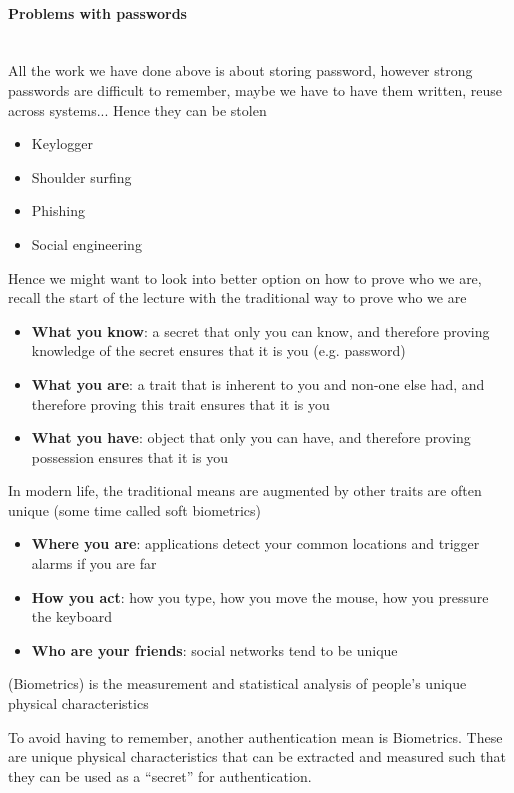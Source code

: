 \paragraph{Problems with passwords}%
\label{par:Problems with passwords}
$ $\\
All the work we have done above is about storing password, however strong passwords are difficult to remember, maybe we have to have them written, reuse across systems... Hence they can be stolen 
\begin{itemize}
    \item Keylogger
    \item Shoulder surfing
    \item Phishing
    \item Social engineering
\end{itemize}
Hence we might want to look into better option on how to prove who we are, recall the start of the lecture with the traditional way to prove who we are 
\begin{itemize}
    \item \textbf{What you know}: a secret that only you can know, and therefore proving knowledge of the secret ensures that it is you (e.g. password)
    \item \textbf{What you are}: a trait that is inherent to you and non-one else had, and therefore proving this trait ensures that it is you
    \item \textbf{What you have}: object that only you can have, and therefore proving possession ensures that it is you
\end{itemize}
In modern life, the traditional means are augmented by other traits are often unique (some time called soft biometrics)
\begin{itemize}
    \item \textbf{Where you are}: applications detect your common locations and trigger alarms if you are far
    \item \textbf{How you act}: how you type, how you move the mouse, how you pressure the keyboard
    \item \textbf{Who are your friends}: social networks tend to be unique
\end{itemize}

\begin{definition}{(Biometrics)}
	is the measurement and statistical analysis of people's unique physical characteristics
\end{definition}
To avoid having to remember, another authentication mean is Biometrics. These are unique physical characteristics that can be extracted and measured such that they can be used as a “secret” for authentication.\\


